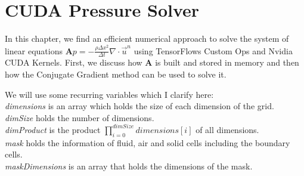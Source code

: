 \chapter{CUDA Pressure Solver}\label{chapter:cudapressuresolver}
In this chapter, we find an efficient numerical approach to solve the system of linear equations $\mathbf{A}p = -\frac{\rho \Delta x^2}{\Delta t}\nabla \cdot \vec{u}^n$ using TensorFlows Custom Ops and Nvidia CUDA Kernels. First, we discuss how \textbf{A} is built and stored in memory and then how the Conjugate Gradient method can be used to solve it. 
\par We will use some recurring variables which I clarify here:\\
\textit{dimensions} is an array which holds the size of each dimension of the grid.\\
\textit{dimSize} holds the number of dimensions.\\
\textit{dimProduct} is the product $\prod_{i=0}^{dimSize} \textit{dimensions}[i]$ of all dimensions. \\
\textit{mask} holds the information of fluid, air and solid cells including the boundary cells.\\
\textit{maskDimensions} is an array that holds the dimensions of the mask.\\

